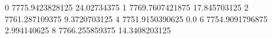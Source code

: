 0 7775.9423828125 24.02734375
1 7769.7607421875 17.845703125
2 7761.287109375 9.3720703125
4 7751.9150390625 0.0
6 7754.9091796875 2.994140625
8 7766.255859375 14.3408203125
